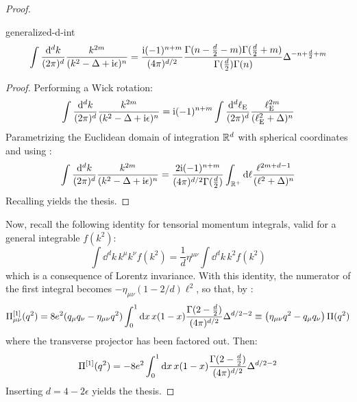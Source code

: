 \begin{proofbox}
\begin{proof}
    \begin{lemma}[before upper = {\tcbtitle}, borderline = {1pt}{0pt}{blue!35!black}]{}{generalized-d-int}
      \begin{equation}
        \int \frac{\mathrm{d}^d k}{(2\pi)^d} \frac{k^{2m}}{(k^2 - \Delta + \mathrm{i} \epsilon)^n} = \frac{\mathrm{i} (-1)^{n + m}}{(4\pi)^{d/2}} \frac{\Gamma(n - \frac{d}{2} - m) \Gamma(\frac{d}{2} + m)}{\Gamma(\frac{d}{2}) \Gamma(n)} \Delta^{-n + \frac{d}{2} + m}
        \label{eq:int-dn-gen}
      \end{equation}
    \end{lemma}

    \begin{proofbox}
      \begin{proof}
        Performing a Wick rotation:
        \begin{equation*}
          \int \frac{\mathrm{d}^d k}{(2\pi)^d} \frac{k^{2m}}{(k^2 - \Delta + \mathrm{i} \epsilon)^n} = \mathrm{i} (-1)^{n + m} \int \frac{\mathrm{d}^d \ell_\text{E}}{(2\pi)^d} \frac{\ell_\text{E}^{2m}}{(\ell_\text{E}^2 + \Delta)^n}
        \end{equation*}
        Parametrizing the Euclidean domain of integration $ \mathbb{R}^d $ with spherical coordinates and using :
        \begin{equation*}
          \int \frac{\mathrm{d}^d k}{(2\pi)^d} \frac{k^{2m}}{(k^2 - \Delta + \mathrm{i} \epsilon)^n} = \frac{2 \mathrm{i} (-1)^{n + m}}{(4\pi)^{d/2} \Gamma(\frac{d}{2})} \int_{\mathbb{R}^+} \mathrm{d} \ell \frac{\ell^{2m + d - 1}}{(\ell^2 + \Delta)^n}
        \end{equation*}
        Recalling  yields the thesis.
      \end{proof}
    \end{proofbox}

    Now, recall the following identity for tensorial momentum integrals, valid for a general integrable $ f(k^2) $:
    \begin{equation}
      \int \dd^d k \, k^\mu k^\nu f(k^2) = \frac{1}{d} \eta^{\mu \nu} \int \dd^d k \, k^2 f(k^2)
    \end{equation}
    which is a consequence of Lorentz invariance. With this identity, the numerator of the first integral becomes $ - \eta_{\mu \nu} (1 - 2/d) \ell^2 $, so that, by :
    \begin{equation*}
      \begin{split}
        \Pi^{[1]}_{\mu \nu}(q^2) = 8e^2 (q_\mu q_\nu - \eta_{\mu \nu} q^2) \int_0^1 \mathrm{d} x \, x (1 - x) \frac{\Gamma(2 - \frac{d}{2})}{(4\pi)^{d/2}} \Delta^{d/2 - 2} \equiv \left( \eta_{\mu \nu} q^2 - q_\mu q_\nu \right) \Pi(q^2)
      \end{split}
    \end{equation*}
    where the transverse projector has been factored out. Then:
    \begin{equation*}
      \Pi^{[1]}(q^2) = - 8e^2 \int_0^1 \mathrm{d} x \, x (1 - x) \frac{\Gamma(2 - \frac{d}{2})}{(4\pi)^{d/2}} \Delta^{d/2 - 2}
    \end{equation*}
    Inserting $ d = 4 - 2 \epsilon $ yields the thesis.
  \end{proof}
\end{proofbox}

